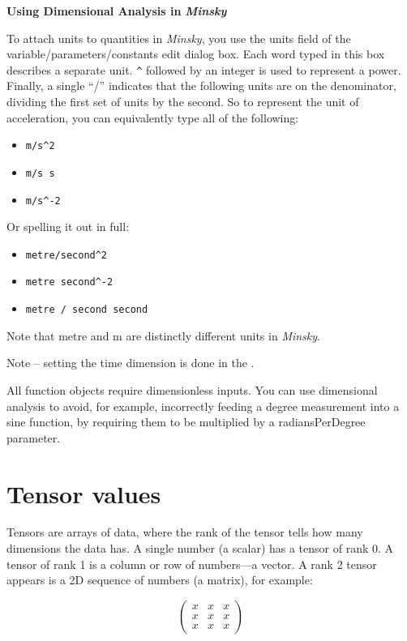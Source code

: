\textbf{Using Dimensional Analysis in }\textbf{\emph{Minsky}}

To attach units to quantities in \emph{Minsky}, you use the units
field of the variable/parameters/constants edit dialog box. Each word
typed in this box describes a separate unit. \verb+^+
followed by an integer is used to represent a power. Finally, a single
``/'' indicates that the following units are on the denominator,
dividing the first set of units by the second. So to represent the
unit of acceleration, you can equivalently type all of the following:
\begin{itemize}
\item \verb+m/s^2+ 
\item \verb+m/s s+ 
\item \verb+m/s^-2+ 
\end{itemize}
Or spelling it out in full:
\begin{itemize}
\item \verb+metre/second^2+ 
\item \verb+metre second^-2+ 
\item \verb+metre / second second+ 
\end{itemize}
Note that metre and m are distinctly different units in \emph{Minsky}.

Note -- setting the time dimension is done in the .

All function objects require dimensionless inputs. You can use dimensional
analysis to avoid, for example, incorrectly feeding a degree measurement
into a sine function, by requiring them to be multiplied by a radiansPerDegree
parameter.

\section{Tensor values}

\label{tensors}

Tensors are arrays of data, where the rank of the tensor tells how
many dimensions the data has. A single number (a scalar) has a tensor
of rank 0. A tensor of rank 1 is a column or row of numbers---a vector.
A rank 2 tensor appears is a 2D sequence of numbers (a matrix), for
example:

\[
\left(\begin{array}{ccc}
x & x & x\\
x & x & x\\
x & x & x
\end{array}\right)
\]

